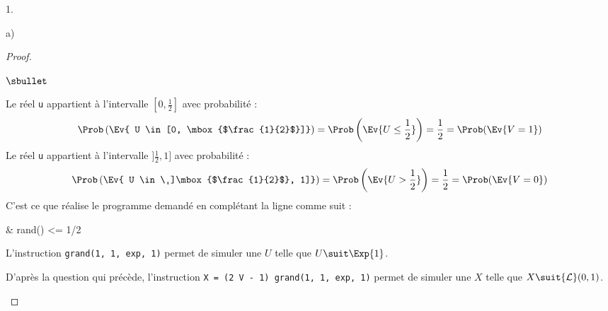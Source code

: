 \begin{noliste}{1.}
\begin{noliste}{a)}
\begin{proof}
\begin{noliste}{$\sbullet$}
\begin{center}
        \end{center}
        Le réel {\tt u} appartient à l'intervalle $[0, \frac{1}{2}]$
        avec probabilité :
        \[
        \Prob\left(\Ev{ U \in [0, \mbox{$\frac{1}{2}$}]} \right) =
        \Prob\left(\Ev{ U \leq \frac{1}{2}} \right) = \dfrac{1}{2} =
        \Prob(\Ev{ V = 1})
        \]
        Le réel {\tt u} appartient à l'intervalle $]\frac{1}{2}, 1]$
        avec probabilité :
        \[
        \Prob\left(\Ev{ U \in \ ]\mbox{$\frac{1}{2}$}, 1]} \right) =
        \Prob\left(\Ev{ U > \frac{1}{2}} \right) = \dfrac{1}{2} =
        \Prob(\Ev{ V = 0})
        \]
        C'est ce que réalise le programme demandé en complétant la
        ligne  comme suit :
        \begin{scilabC}{1}
          & \qquad {} rand() <= 1/2 \nl %
        \end{scilabC}
        
        
        
        \newpage
        
        
      \item L'instruction {\tt grand(1, 1, \ttq{}exp\ttq{}, 1)} permet
        de simuler une \var $U$ telle que $U \suit \Exp{1}$.

      \item D'après la question qui précède, l'instruction {\tt X = (2
          \Sfois{} V - 1) \Sfois{} grand(1, 1, \ttq{}exp\ttq{}, 1)}
        permet de simuler une \var $X$ telle que $X \suit {\cal L}(0,
        1)$.


\end{noliste}
\end{proof}
\end{noliste}
\end{noliste}
